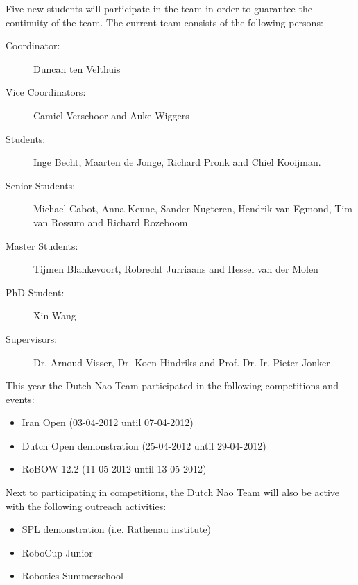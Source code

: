 \documentclass[11pt]{llncs}
\begin{document}
Five new students will participate in the team in order to guarantee the continuity of the team. 
The current team consists of the following persons:
\begin{description}

\item[Coordinator:] Duncan ten Velthuis
\item[Vice Coordinators:] Camiel Verschoor and Auke Wiggers
\item[Students:] Inge Becht, Maarten de Jonge, Richard Pronk and Chiel Kooijman.
\item[Senior Students:] Michael Cabot, Anna Keune, Sander Nugteren, Hendrik van Egmond, Tim van Rossum and Richard Rozeboom
\item[Master Students:] Tijmen Blankevoort, Robrecht Jurriaans and Hessel van der Molen
\item[PhD Student:] Xin Wang
\item[Supervisors:] Dr. Arnoud Visser, Dr. Koen Hindriks and Prof. Dr. Ir. Pieter Jonker
\end{description}
This year the Dutch Nao Team participated in the following competitions and events:
\begin{itemize}
\item Iran Open (03-04-2012 until 07-04-2012)
\item Dutch Open demonstration (25-04-2012 until 29-04-2012)
\item RoBOW 12.2 (11-05-2012 until 13-05-2012)
\end{itemize}
Next to participating in competitions, the Dutch Nao Team will also be active with the following outreach activities:
\begin{itemize}
\item SPL demonstration (i.e. Rathenau institute)
\item RoboCup Junior 
\item Robotics Summerschool
\end{itemize}
\end{document}

